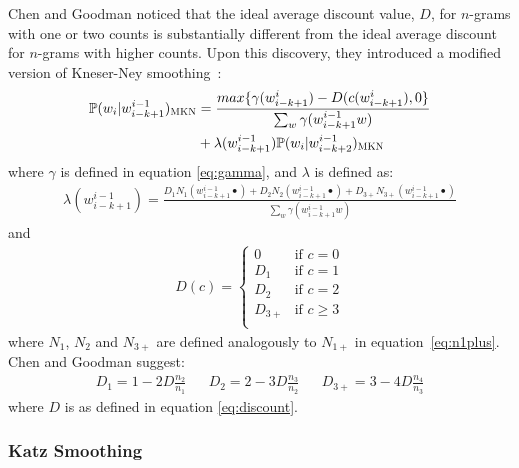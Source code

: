 \documentclass[a4paper, 12pt]{report}
\begin{document}
Chen and Goodman noticed that the ideal average discount value, $D$, for $n$-grams with one or two counts is substantially different from the ideal average discount for $n$-grams with higher counts. Upon this discovery, they introduced a modified version of Kneser-Ney smoothing~\cite{modified_kneser_ney:chen1999}:
\begin{equation}
\begin{aligned}
	\mathbb{P}(w_i | w_{i - k + 1}^{i - 1})_{\text{\scshape MKN}} &= \frac{max\{\gamma(w_{i - k + 1}^{i}) - D(c(w_{i - k + 1}^{i}), 0\}}{\sum_w \gamma(w_{i - k + 1}^{i - 1}w)} \\
	&+ \lambda(w_{i - k + 1}^{i - 1})\mathbb{P}(w_i | w_{i - k + 2}^{i - 1})_{\text{\scshape MKN}}
\end{aligned}
\end{equation}
where $\gamma$ is defined in equation \ref{eq:gamma}, and $\lambda$ is defined as:
\begin{gather}
	\lambda(w_{i - k + 1}^{i - 1}) = \frac{D_1N_1(w_{i - k + 1}^{i - 1}\bullet) + D_2N_2(w_{i - k + 1}^{i - 1}\bullet) + D_{3+}N_{3+}(w_{i - k + 1}^{i - 1}\bullet)}{\sum_w \gamma(w_{i - k + 1}^{i - 1}w)}
\end{gather}
and
\begin{gather}
	D(c) = \begin{cases}
		0 &\text{if }c = 0 \\
		D_1 &\text{if }c = 1 \\
		D_2 &\text{if }c = 2 \\
		D_{3+} &\text{if }c \geq 3 \\
	\end{cases}
\end{gather}
where $N_1$, $N_2$ and $N_{3+}$ are defined analogously to $N_{1+}$ in equation~\ref{eq:n1plus}. Chen and Goodman suggest:
\begin{align}
	D_1 = 1 - 2D\frac{n_2}{n_1} && D_2 = 2 - 3D\frac{n_3}{n_2} && D_{3+} = 3 - 4D\frac{n_4}{n_3}
\end{align}
where $D$ is as defined in equation \ref{eq:discount}.

\subsubsection{Katz Smoothing}
\end{document}
